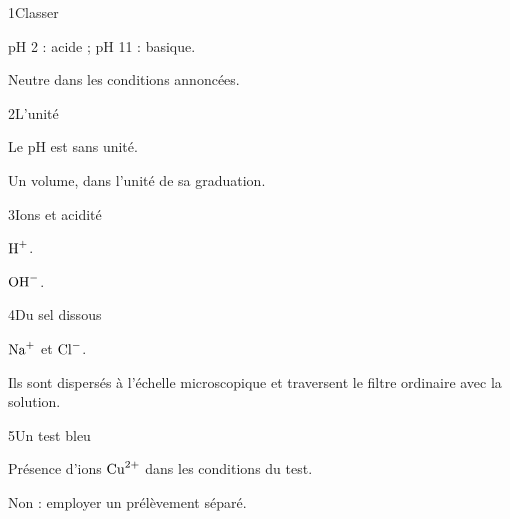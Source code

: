 \par\noindent\begin{minipage}{\linewidth}
\begin{corrige}{1}{Classer}
\begin{questions}
\item pH 2 : acide ; pH 11 : basique.
\item Neutre dans les conditions annoncées.
\end{questions}
\end{corrige}
\end{minipage}
\par\noindent\begin{minipage}{\linewidth}
\begin{corrige}{2}{L’unité}
\begin{questions}
\item Le pH est sans unité.
\item Un volume, dans l’unité de sa graduation.
\end{questions}
\end{corrige}
\end{minipage}
\par\noindent\begin{minipage}{\linewidth}
\begin{corrige}{3}{Ions et acidité}
\begin{questions}
\item $\ce{H+}$.
\item $\ce{OH-}$.
\end{questions}
\end{corrige}
\end{minipage}
\par\noindent\begin{minipage}{\linewidth}
\begin{corrige}{4}{Du sel dissous}
\begin{questions}
\item $\ce{Na+}$ et $\ce{Cl-}$.
\item Ils sont dispersés à l’échelle microscopique et traversent le filtre ordinaire avec la solution.
\end{questions}
\end{corrige}
\end{minipage}
\par\noindent\begin{minipage}{\linewidth}
\begin{corrige}{5}{Un test bleu}
\begin{questions}
\item Présence d’ions $\ce{Cu^{2+}}$ dans les conditions du test.
\item Non : employer un prélèvement séparé.
\end{questions}
\end{corrige}
\end{minipage}
